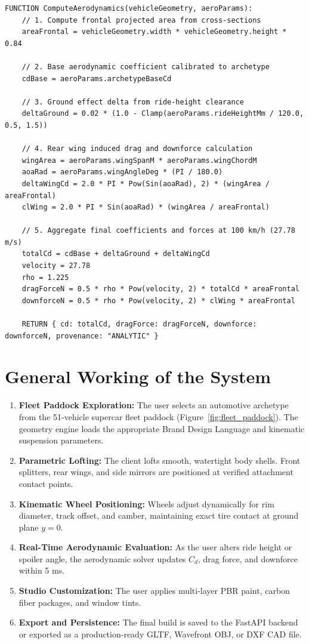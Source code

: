\documentclass[12pt,a4paper]{report}
\begin{document}
\begin{lstlisting}[language=pseudo,captionpos=t,basicstyle=\ttfamily\scriptsize,caption={Component-Buildup Aerodynamic Drag Solver},label={lst:aero}]
FUNCTION ComputeAerodynamics(vehicleGeometry, aeroParams):
    // 1. Compute frontal projected area from cross-sections
    areaFrontal = vehicleGeometry.width * vehicleGeometry.height * 0.84
    
    // 2. Base aerodynamic coefficient calibrated to archetype
    cdBase = aeroParams.archetypeBaseCd
    
    // 3. Ground effect delta from ride-height clearance
    deltaGround = 0.02 * (1.0 - Clamp(aeroParams.rideHeightMm / 120.0, 0.5, 1.5))
    
    // 4. Rear wing induced drag and downforce calculation
    wingArea = aeroParams.wingSpanM * aeroParams.wingChordM
    aoaRad = aeroParams.wingAngleDeg * (PI / 180.0)
    deltaWingCd = 2.0 * PI * Pow(Sin(aoaRad), 2) * (wingArea / areaFrontal)
    clWing = 2.0 * PI * Sin(aoaRad) * (wingArea / areaFrontal)
    
    // 5. Aggregate final coefficients and forces at 100 km/h (27.78 m/s)
    totalCd = cdBase + deltaGround + deltaWingCd
    velocity = 27.78
    rho = 1.225
    dragForceN = 0.5 * rho * Pow(velocity, 2) * totalCd * areaFrontal
    downforceN = 0.5 * rho * Pow(velocity, 2) * clWing * areaFrontal
    
    RETURN { cd: totalCd, dragForce: dragForceN, downforce: downforceN, provenance: "ANALYTIC" }
\end{lstlisting}

\section{General Working of the System}
\begin{enumerate}
    \item \textbf{Fleet Paddock Exploration:} The user selects an automotive archetype from the 51-vehicle supercar fleet paddock (Figure~\ref{fig:fleet_paddock}). The geometry engine loads the appropriate Brand Design Language and kinematic suspension parameters.
    \item \textbf{Parametric Lofting:} The client lofts smooth, watertight body shells. Front splitters, rear wings, and side mirrors are positioned at verified attachment contact points.
    \item \textbf{Kinematic Wheel Positioning:} Wheels adjust dynamically for rim diameter, track offset, and camber, maintaining exact tire contact at ground plane $y = 0$.
    \item \textbf{Real-Time Aerodynamic Evaluation:} As the user alters ride height or spoiler angle, the aerodynamic solver updates $C_d$, drag force, and downforce within 5 ms.
    \item \textbf{Studio Customization:} The user applies multi-layer PBR paint, carbon fiber packages, and window tints.
    \item \textbf{Export and Persistence:} The final build is saved to the FastAPI backend or exported as a production-ready GLTF, Wavefront OBJ, or DXF CAD file.
\end{enumerate}
\end{document}
